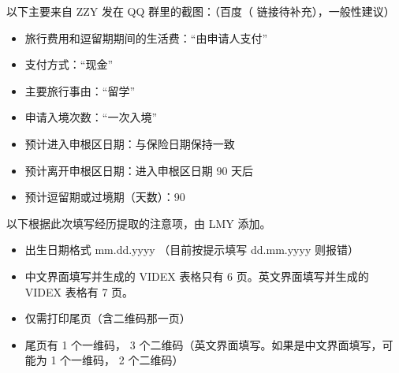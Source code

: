 \documentclass[final]{book}
\begin{document}
以下主要来自 ZZY 发在 QQ 群里的截图：（百度（%
链接待补充），一般性建议）
\begin{itemize}
\item 旅行费用和逗留期期间的生活费：“由申请人支付”
\item 支付方式：“现金”
\item 主要旅行事由：“留学”
\item 申请入境次数：“一次入境”
\item 预计进入申根区日期：与保险日期保持一致
\item 预计离开申根区日期：进入申根区日期 90 天后
\item 预计逗留期或过境期（天数）：90
\end{itemize}
以下根据此次填写经历提取的注意项，由 LMY 添加。
\begin{itemize}
  \item 出生日期格式 mm.dd.yyyy （目前按提示填写 dd.mm.yyyy 则报错）
  \item 中文界面填写并生成的 VIDEX 表格只有 6 页。英文界面填写并生成的 VIDEX 表格有 7 页。
  \item 仅需打印尾页（含二维码那一页）
  \item 尾页有 1 个一维码， 3 个二维码（英文界面填写。如果是中文界面填写，可能为 1 个一维码， 2 个二维码）
\end{itemize}
\end{document}
